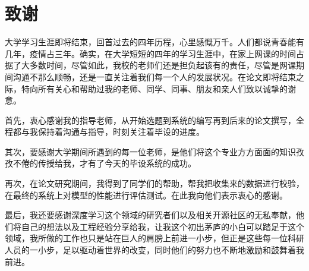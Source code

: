\section*{致谢}

大学学习生涯即将结束，回首过去的四年历程，心里感慨万千。人们都说青春能有几年，疫情占三年。确实，在大学短短的四年的学习生涯中，在家上网课的时间占据了大多数时间，尽管如此，我校的老师们还是担负起该有的责任，尽管是网课期间沟通不那么顺畅，还是一直关注着我们每一个人的发展状况。在论文即将结束之际，特向所有关心和帮助过我的老师、同学、同事、朋友和亲人们致以诚挚的谢意。

首先，衷心感谢我的指导老师，从开始选题到系统的编写再到后来的论文撰写，全程都与我保持着沟通与指导，时刻关注着毕设的进度。

其次，要感谢大学期间所遇到的每一位老师，是他们将这个专业方方面面的知识孜孜不倦的传授给我，才有了今天的毕设系统的成功。

再次，在论文研究期间，我得到了同学们的帮助，帮我把收集来的数据进行校验，在最终的系统上对模型的性能进行评估测试。在此我向他们表示衷心的感谢。

最后，我还要感谢深度学习这个领域的研究者们以及相关开源社区的无私奉献，他们将自己的想法以及工程经验分享给我，让我这个初出茅庐的小白可以踏足于这个领域，我所做的工作也只是站在巨人的肩膀上前进一小步，但正是这些每一位科研人员的一小步，足以驱动着世界的改变，同时他们的努力也不断地激励和鼓舞着我前进。
